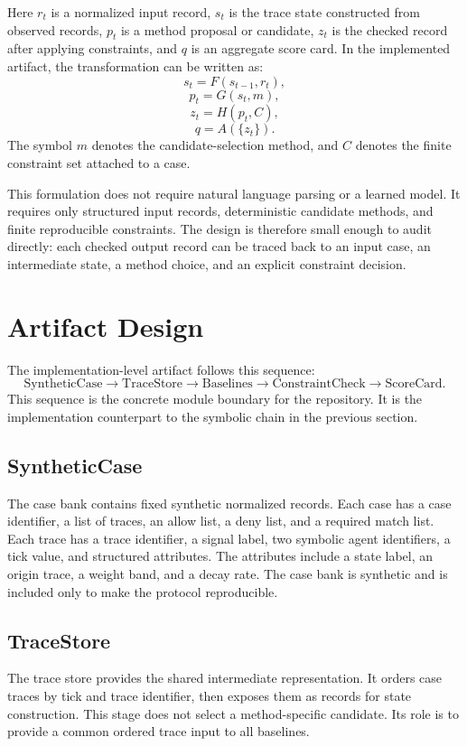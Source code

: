\documentclass[11pt]{article}
\begin{document}
Here $r_t$ is a normalized input record, $s_t$ is the trace state constructed
from observed records, $p_t$ is a method proposal or candidate, $z_t$ is the
checked record after applying constraints, and $q$ is an aggregate score card.
In the implemented artifact, the transformation can be written as:
\[
s_t = F(s_{t-1}, r_t),
\]
\[
p_t = G(s_t, m),
\]
\[
z_t = H(p_t, C),
\]
\[
q = A(\{z_t\}).
\]
The symbol $m$ denotes the candidate-selection method, and $C$ denotes the
finite constraint set attached to a case.

This formulation does not require natural language parsing or a learned model.
It requires only structured input records, deterministic candidate methods, and
finite reproducible constraints. The design is therefore small enough to audit
directly: each checked output record can be traced back to an input case, an
intermediate state, a method choice, and an explicit constraint decision.

\section{Artifact Design}

The implementation-level artifact follows this sequence:
\[
\text{SyntheticCase} \rightarrow \text{TraceStore} \rightarrow
\text{Baselines} \rightarrow \text{ConstraintCheck} \rightarrow
\text{ScoreCard}.
\]
This sequence is the concrete module boundary for the repository. It is the
implementation counterpart to the symbolic chain in the previous section.

\subsection{SyntheticCase}

The case bank contains fixed synthetic normalized records. Each case has a
case identifier, a list of traces, an allow list, a deny list, and a required
match list. Each trace has a trace identifier, a signal label, two symbolic
agent identifiers, a tick value, and structured attributes. The attributes
include a state label, an origin trace, a weight band, and a decay rate. The
case bank is synthetic and is included only to make the protocol reproducible.

\subsection{TraceStore}

The trace store provides the shared intermediate representation. It orders
case traces by tick and trace identifier, then exposes them as records for
state construction. This stage does not select a method-specific candidate. Its
role is to provide a common ordered trace input to all baselines.
\end{document}
